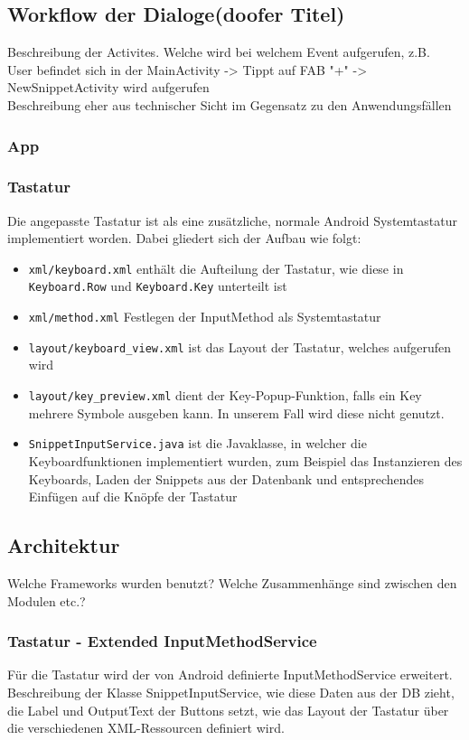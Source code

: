 \documentclass[11pt]{article}
\begin{document}
	\subsection{Workflow der Dialoge(doofer Titel)}
	Beschreibung der Activites. Welche wird bei welchem Event aufgerufen, z.B. \\
	User befindet sich in der MainActivity -> Tippt auf FAB "+" -> NewSnippetActivity wird aufgerufen \\
	Beschreibung eher aus technischer Sicht im Gegensatz zu den Anwendungsfällen
	
	\subsubsection{App}
	\subsubsection{Tastatur}
	Die angepasste Tastatur ist als eine zusätzliche, normale Android Systemtastatur implementiert worden. Dabei gliedert sich der Aufbau wie folgt: 
	\begin{itemize}
		\item \texttt{xml/keyboard.xml} enthält die Aufteilung der Tastatur, wie diese in \texttt{Keyboard.Row} und \texttt{Keyboard.Key} unterteilt ist
		\item \texttt{xml/method.xml} Festlegen der InputMethod als Systemtastatur
		\item \texttt{layout/keyboard\_view.xml} ist das Layout der Tastatur, welches aufgerufen wird
		\item \texttt{layout/key\_preview.xml} dient der Key-Popup-Funktion, falls ein Key mehrere Symbole ausgeben kann. In unserem Fall wird diese nicht genutzt.
		\item \texttt{SnippetInputService.java} ist die Javaklasse, in welcher die Keyboardfunktionen implementiert wurden, zum Beispiel das Instanzieren des Keyboards, Laden der Snippets aus der Datenbank und entsprechendes Einfügen auf die Knöpfe der Tastatur
	\end{itemize}
	
	
	\subsection{Architektur}
	Welche Frameworks wurden benutzt? Welche Zusammenhänge sind zwischen den Modulen etc.?
	\subsubsection{Tastatur - Extended InputMethodService}
	Für die Tastatur wird der von Android definierte InputMethodService erweitert. \\
	Beschreibung der Klasse SnippetInputService, wie diese Daten aus der DB zieht, die Label und OutputText der Buttons setzt, wie das Layout der Tastatur über die verschiedenen XML-Ressourcen definiert wird.
	
\end{document}
